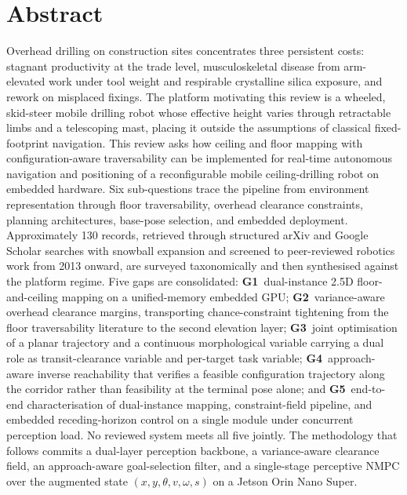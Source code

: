 \documentclass[11pt,a4paper]{article}
\begin{document}
\section*{Abstract}
Overhead drilling on construction sites concentrates three persistent costs: stagnant productivity at the trade level, musculoskeletal disease from arm-elevated work under tool weight and respirable crystalline silica exposure, and rework on misplaced fixings. The platform motivating this review is a wheeled, skid-steer mobile drilling robot whose effective height varies through retractable limbs and a telescoping mast, placing it outside the assumptions of classical fixed-footprint navigation. This review asks how ceiling and floor mapping with configuration-aware traversability can be implemented for real-time autonomous navigation and positioning of a reconfigurable mobile ceiling-drilling robot on embedded hardware. Six sub-questions trace the pipeline from environment representation through floor traversability, overhead clearance constraints, planning architectures, base-pose selection, and embedded deployment. Approximately 130 records, retrieved through structured arXiv and Google Scholar searches with snowball expansion and screened to peer-reviewed robotics work from 2013 onward, are surveyed taxonomically and then synthesised against the platform regime. Five gaps are consolidated: \textbf{G1}~dual-instance 2.5D floor-and-ceiling mapping on a unified-memory embedded GPU; \textbf{G2}~variance-aware overhead clearance margins, transporting chance-constraint tightening from the floor traversability literature to the second elevation layer; \textbf{G3}~joint optimisation of a planar trajectory and a continuous morphological variable carrying a dual role as transit-clearance variable and per-target task variable; \textbf{G4}~approach-aware inverse reachability that verifies a feasible configuration trajectory along the corridor rather than feasibility at the terminal pose alone; and \textbf{G5}~end-to-end characterisation of dual-instance mapping, constraint-field pipeline, and embedded receding-horizon control on a single module under concurrent perception load. No reviewed system meets all five jointly. The methodology that follows commits a dual-layer perception backbone, a variance-aware clearance field, an approach-aware goal-selection filter, and a single-stage perceptive NMPC over the augmented state $(x,y,\theta,v,\omega,s)$ on a Jetson Orin Nano Super.

\newpage
\tableofcontents
\newpage
\end{document}
